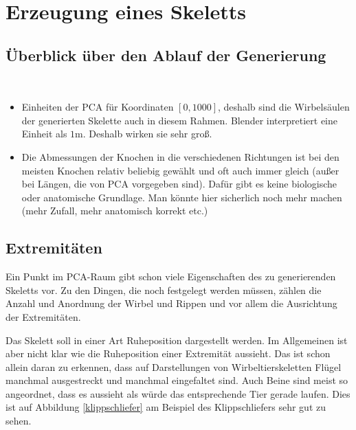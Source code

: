\chapter{Erzeugung eines Skeletts}
\label{chapter:non_pca_things}

\section{Überblick über den Ablauf der Generierung}

\\

\begin{itemize}
 \item Einheiten der PCA für Koordinaten $[0, 1000]$, deshalb sind die Wirbelsäulen der generierten Skelette auch in diesem Rahmen. Blender interpretiert eine Einheit als $1$m. Deshalb wirken sie sehr groß.
 
 \item Die Abmessungen der Knochen in die verschiedenen Richtungen ist bei den meisten Knochen relativ beliebig gewählt und oft auch immer gleich (außer bei Längen, die von PCA vorgegeben sind). Dafür gibt es keine biologische oder anatomische Grundlage. Man könnte hier sicherlich noch mehr machen (mehr Zufall, mehr anatomisch korrekt etc.)
\end{itemize}

\section{Extremitäten}
\label{section:extremity_generation}

Ein Punkt im PCA-Raum gibt schon viele Eigenschaften des zu generierenden Skeletts vor. Zu den Dingen, die noch festgelegt werden müssen, zählen \zb die Anzahl und Anordnung der Wirbel und Rippen und vor allem die Ausrichtung der Extremitäten.

Das Skelett soll in einer Art Ruheposition dargestellt werden. Im Allgemeinen ist aber nicht klar wie die Ruheposition einer Extremität aussieht. Das ist schon allein daran zu erkennen, dass auf Darstellungen von Wirbeltierskeletten Flügel manchmal ausgestreckt und manchmal eingefaltet sind. Auch Beine sind meist so angeordnet, dass es aussieht als würde das entsprechende Tier gerade laufen. Dies ist auf Abbildung \ref{klippschliefer} am Beispiel des Klippschliefers sehr gut zu sehen.

